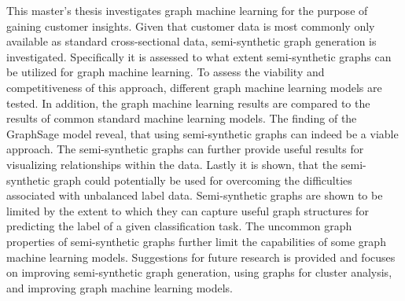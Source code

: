 
  \onehalfspacing

  This master's thesis investigates graph machine learning for the purpose of
  gaining customer insights. Given that customer data is most commonly only
  available as standard cross-sectional data, semi-synthetic graph generation is
  investigated. Specifically it is assessed to what extent semi-synthetic graphs
  can be utilized for graph machine learning. To assess the viability and
  competitiveness of this approach, different graph machine learning models
  are tested. In addition, the graph machine learning results are compared to
  the results of common standard machine learning models. The finding of
  the GraphSage model reveal, that using semi-synthetic graphs can indeed be a
  viable approach. The semi-synthetic graphs can further provide useful results
  for visualizing relationships within the data. Lastly it is shown, that the
  semi-synthetic graph could potentially be used for overcoming the
  difficulties associated with unbalanced label data. Semi-synthetic graphs are 
  shown to be limited by the extent to which they can capture useful graph 
  structures for predicting the label of a given classification task. The
  uncommon graph properties of semi-synthetic graphs further limit the
  capabilities of some graph machine learning models. Suggestions for future 
  research is provided and focuses on improving semi-synthetic graph generation, 
  using graphs for cluster analysis, and improving graph machine learning models.
